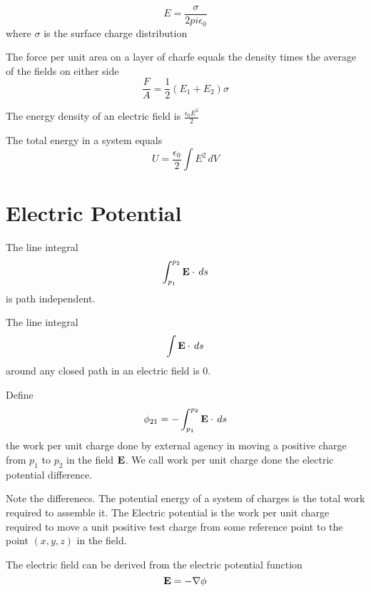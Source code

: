 \documentclass[a4paper]{article}
\begin{document}
\begin{thm} $$E=\frac{\sigma}{2pi\epsilon_0}$$ where $\sigma$ is the surface charge distribution
\end{thm}

\begin{thm} The force per unit area on a layer of charfe equals the density times the average of the fields on either side $$\frac{F}{A}=\frac{1}{2}(E_1+E_2)\sigma$$
\end{thm}

\begin{defn} The energy density of an electric field is $\frac{\epsilon_0E^2}{2}$
\end{defn}

\begin{thm} The total energy in a system equals $$U=\frac{\epsilon_0}{2}\int E^2\,dV$$
\end{thm}

\pagebreak
\section{Electric Potential}
\begin{prp} The line integral $$\int_{p_1}^{p_2}\vb{E}\cdot\,ds$$ is path independent. 
\end{prp}

\begin{prp} The line integral $$\int \vb{E}\cdot\,ds$$ around any closed path in an electric field is $0$. 
\end{prp}

\begin{defn} Define $$\phi_{21}=-\int_{p_1}^{p_2}\vb{E}\cdot\,ds$$ the work per unit charge done by external agency in moving a positive charge from $p_1$ to $p_2$ in the field $\vb{E}$. We call work per unit charge done the electric potential difference. 
\end{defn}

Note the differenecs. The potential energy of a system of charges is the total work required to assemble it. The Electric potential is the work per unit charge required to move a unit positive test charge from some reference point to the point $(x,y,z)$ in the field. 

\begin{thm} The electric field can be derived from the electric potential function $$\vb{E}=-\nabla\phi$$
\end{thm}
\end{document}
